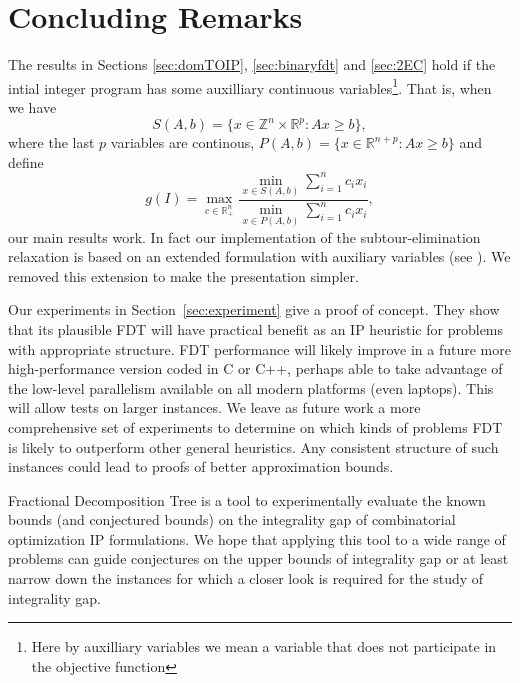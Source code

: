 \section{Concluding Remarks}

The results in Sections \ref{sec:domTOIP}, \ref{sec:binaryfdt}  and \ref{sec:2EC} hold if the intial integer program has some auxilliary continuous variables\footnote{Here by auxilliary variables we mean a variable that does not participate in the objective function}. That is, when we have 
\begin{equation*}
S(A,b) = \{x\in \mathbb{Z}^n\times \mathbb{R}^p: Ax\geq b\},
\end{equation*}
where the last $p$ variables are continous, $P(A,b) = \{x\in \mathbb{R}^{n+p}: Ax\geq b\}$
and define
\begin{equation*}
g(I) = \max_{c\in \mathbb{R}^n_+}\frac{\min_{x\in S(A,b)} \sum_{i=1}^{n}c_ix_i}{\min_{x\in P(A,b)} \sum_{i=1}^{n}c_ix_i},
\end{equation*}
our main results work. In fact our implementation of the subtour-elimination relaxation is based on an extended formulation with auxiliary variables (see \cite{subtour-extended}). We removed this extension to make the presentation simpler.

Our experiments in Section~\ref{sec:experiment} give a proof of concept. They show that its plausible FDT will have practical benefit as an IP heuristic for problems with appropriate structure. FDT performance will likely improve in a future more high-performance version coded in C or C++, perhaps able to take advantage of the low-level parallelism available on all modern platforms (even laptops).  This will allow tests on larger instances. We leave as future work a more comprehensive set of experiments to determine on which kinds of problems FDT is likely to outperform other general heuristics. Any consistent structure of such instances could lead to proofs of better approximation bounds.

Fractional Decomposition Tree is a tool to experimentally evaluate the known bounds (and conjectured bounds) on the integrality gap of combinatorial optimization IP formulations. We hope that applying this tool to a wide range of problems can guide conjectures on the upper bounds of integrality gap or at least narrow down the instances for which a closer look is required for the study of integrality gap.


